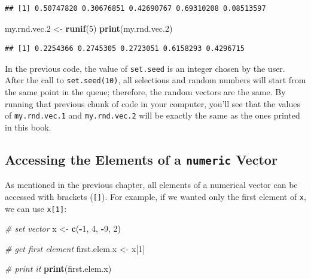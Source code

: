 \documentclass[11pt,]{book}
\newenvironment{Shaded}{\begin{snugshade}}{\end{snugshade}}
\newcommand{\KeywordTok}[1]{\textcolor[rgb]{0.27,0.27,0.27}{\textbf{#1}}}
\newcommand{\DecValTok}[1]{\textcolor[rgb]{0.06,0.06,0.06}{#1}}
\newcommand{\StringTok}[1]{\textcolor[rgb]{0.5,0.5,0.5}{#1}}
\newcommand{\CommentTok}[1]{\textcolor[rgb]{0.56,0.35,0.01}{\textit{#1}}}
\newcommand{\OperatorTok}[1]{\textcolor[rgb]{0.81,0.36,0.00}{\textbf{#1}}}
\newcommand{\NormalTok}[1]{#1}
\begin{document}
\begin{verbatim}
## [1] 0.50747820 0.30676851 0.42690767 0.69310208 0.08513597
\end{verbatim}

\begin{Shaded}
\begin{Highlighting}[]
\NormalTok{my.rnd.vec.}\DecValTok{2}\NormalTok{ <-}\StringTok{ }\KeywordTok{runif}\NormalTok{(}\DecValTok{5}\NormalTok{)}
\KeywordTok{print}\NormalTok{(my.rnd.vec.}\DecValTok{2}\NormalTok{)}
\end{Highlighting}
\end{Shaded}

\begin{verbatim}
## [1] 0.2254366 0.2745305 0.2723051 0.6158293 0.4296715
\end{verbatim}

In the previous code, the value of \texttt{set.seed} is an integer
chosen by the user. After the call to \texttt{set.seed(10)}, all
selections and random numbers will start from the same point in the
queue; therefore, the random vectors are the same. By running that
previous chunk of code in your computer, you'll see that the values of
\texttt{my.rnd.vec.1} and \texttt{my.rnd.vec.2} will be exactly the same
as the ones printed in this book.

\subsection{\texorpdfstring{Accessing the Elements of a \texttt{numeric}
Vector}{Accessing the Elements of a numeric Vector}}\label{accessing-the-elements-of-a-numeric-vector}

As mentioned in the previous chapter, all elements of a numerical vector
can be accessed with brackets (\texttt{{[}{]}}). For example, if we
wanted only the first element of \texttt{x}, we can use
\texttt{x{[}1{]}}:

\begin{Shaded}
\begin{Highlighting}[]
\CommentTok{# set vector}
\NormalTok{x <-}\StringTok{ }\KeywordTok{c}\NormalTok{(}\OperatorTok{-}\DecValTok{1}\NormalTok{, }\DecValTok{4}\NormalTok{, }\OperatorTok{-}\DecValTok{9}\NormalTok{, }\DecValTok{2}\NormalTok{)}

\CommentTok{# get first element}
\NormalTok{first.elem.x <-}\StringTok{ }\NormalTok{x[}\DecValTok{1}\NormalTok{]}

\CommentTok{# print it}
\KeywordTok{print}\NormalTok{(first.elem.x)}
\end{Highlighting}
\end{Shaded}
\end{document}
